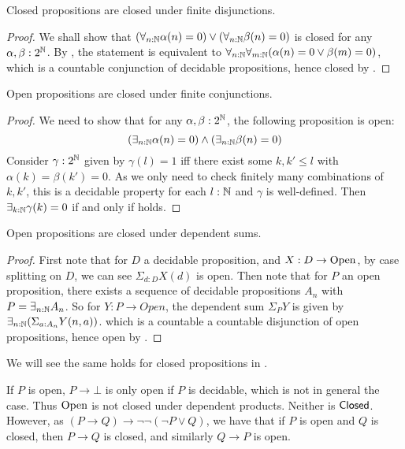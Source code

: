 \begin{lemma}\label{ClosedFiniteDisjunction} 
  Closed propositions are closed under finite disjunctions. 
\end{lemma}
\begin{proof}
  We shall show that 
  $(\forall_{n:\mathbb{N}} \alpha(n) = 0 )\vee (\forall_{n:\mathbb{N}} \beta(n) = 0 )$ is closed for any $\alpha,\beta:2^{\mathbb{N}}$.
  By , the statement is equivalent to 
  $ \forall_{n:\mathbb{N}}  \forall_{m:\mathbb{N}}  (\alpha(n) = 0 \vee \beta(m) = 0)$, 
  which is a countable conjunction of decidable propositions, 
  hence closed by .
\end{proof}
\begin{lemma}\label{OpenFiniteConjunction}
  Open propositions are closed under finite conjunctions. 
\end{lemma}
\begin{proof}
  We need to show that for any $\alpha,\beta:2^{\mathbb{N}}$, the following proposition is open:
  \begin{equation}\label{eqnConjunctionOpen}
    (\exists_{n:\mathbb{N}} \alpha(n) = 0 )\wedge(\exists_{n:\mathbb{N}} \beta(n) = 0 )
  \end{equation}
  Consider $\gamma:2^{\mathbb{N}}$ given by 
  $\gamma(l) = 1$ iff there exist some $k,k'\leq l$ with 
  $\alpha(k) = \beta(k') = 0$. 
  As we only need to check finitely many combinations 
  of $k,k'$, this is a decidable property for each $l:\mathbb{N}$ and $\gamma$ is well-defined. 
  Then $\exists_{k:\mathbb{N}}\gamma(k)=0$ if and only if  holds.
\end{proof}

\begin{lemma}\label{OpenDependentSums}
  Open propositions are closed under dependent sums.
\end{lemma}
\begin{proof}
  First note that for $D$ a decidable proposition, and $X:D \to \mathrm{Open}$,
  by case splitting on $D$, we can see 
  $\Sigma_{d:D} X(d)$ is open.
%
  Then note that for $P$ an open proposition, 
  there exists a sequence of decidable propositions $A_n$ with 
  $P = \exists_{n:\mathbb{N}} A_n $.
%
  So for $Y : P \to Open $, the dependent sum $\Sigma_P Y$ is given by 
  $\exists_{n:\mathbb{N}} (\Sigma_{a:A_n} Y(n,a))$. 
  which is a countable a countable disjunction of open propositions, 
  hence open by .
\end{proof}

We will see the same holds for closed propositions in .

\begin{remark}\label{ImplicationOpenClosed}
  If $P$ is open, $P \to \bot$ is only open if $P$ is decidable, which is not in general the case. 
  Thus $\mathrm{Open}$ is not closed under dependent products. Neither is $\mathsf{Closed}$. 
  However, as $(P\to Q)  \to \neg \neg (\neg P \vee Q)$,
  we have that if $P$ is open and $Q$ is closed, then $P\to Q$ is closed, and similarly $Q\to P$ is open.
\end{remark}
